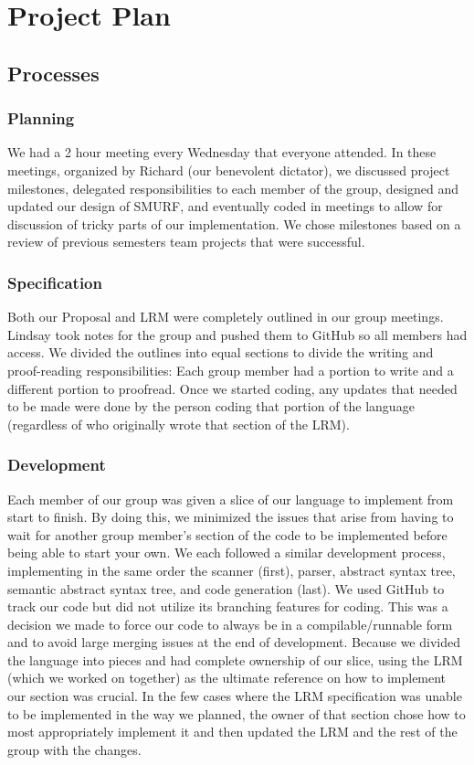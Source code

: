 \section{Project Plan}

	\subsection{Processes}
		
		\subsubsection{Planning}
		We had a 2 hour meeting every Wednesday that everyone attended. In these meetings, organized by Richard (our benevolent dictator), we discussed project milestones, delegated responsibilities to each member of the group, designed and updated our design of SMURF, and eventually coded in meetings to allow for discussion of tricky parts of our implementation. We chose milestones based on a review of previous semesters team projects that were successful. 
				
		\subsubsection{Specification}
		Both our Proposal and LRM were completely outlined in our group meetings. Lindsay took notes for the group and pushed them to GitHub so all members had access.  We divided the outlines into equal sections to divide the writing and proof-reading responsibilities: Each group member had a portion to write and a different portion to proofread. Once we started coding, any updates that needed to be made were done by the person coding that portion of the language (regardless of who originally wrote that section of the LRM). 
		
		\subsubsection{Development}
		Each member of our group was given a slice of our language to implement from start to finish. By doing this, we minimized the issues that arise from having to wait for another group member's section of the code to be implemented before being able to start your own. We each followed a similar development process, implementing in the same order the scanner (first), parser, abstract syntax tree, semantic abstract syntax tree, and code generation (last). We used GitHub to track our code but did not utilize its branching features for coding. This was a decision we made to force our code to always be in a compilable/runnable form and to avoid large merging issues at the end of development. Because we divided the language into pieces and had complete ownership of our slice, using the LRM (which we worked on together) as the ultimate reference on how to implement our section was crucial. In the few cases where the LRM specification was unable to be implemented in the way we planned, the owner of that section chose how to most appropriately implement it and then updated the LRM and the rest of the group with the changes.
		
